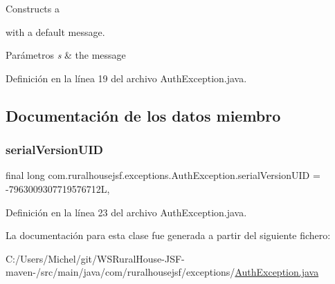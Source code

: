 Constructs a
\begin{DoxyCode}{0}
\end{DoxyCode}
 with a default message. 
\begin{DoxyParams}{Parámetros}
{\em s} & the message \\
\hline
\end{DoxyParams}


Definición en la línea 19 del archivo Auth\+Exception.\+java.



\subsection{Documentación de los datos miembro}
\mbox{\label{classcom_1_1ruralhousejsf_1_1exceptions_1_1_auth_exception_a0bda3b553296d4340933a563b323bb5f}} 
\subsubsection{\texorpdfstring{serialVersionUID}{serialVersionUID}}
{\footnotesize\ttfamily final long com.\+ruralhousejsf.\+exceptions.\+Auth\+Exception.\+serial\+Version\+U\+ID = -\/7963009307719576712L\hspace{0.3cm}{\ttfamily [static]}, {\ttfamily [private]}}



Definición en la línea 23 del archivo Auth\+Exception.\+java.



La documentación para esta clase fue generada a partir del siguiente fichero\+:\begin{DoxyCompactItemize}
\item 
C\+:/\+Users/\+Michel/git/\+W\+S\+Rural\+House-\/\+J\+S\+F-\/maven-\//src/main/java/com/ruralhousejsf/exceptions/\mbox{\hyperlink{_auth_exception_8java}{Auth\+Exception.\+java}}\end{DoxyCompactItemize}
